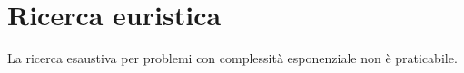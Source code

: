 \chapter{Ricerca euristica}
La ricerca esaustiva per problemi con complessit\`a esponenziale non \`e praticabile.